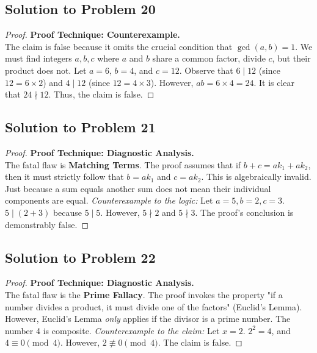 \documentclass[12pt]{article}
\begin{document}
\subsection{Solution to Problem 20}
\begin{proof}
\textbf{Proof Technique: Counterexample.} \\
The claim is false because it omits the crucial condition that $\gcd(a, b) = 1$. We must find integers $a, b, c$ where $a$ and $b$ share a common factor, divide $c$, but their product does not.
Let $a = 6$, $b = 4$, and $c = 12$.
Observe that $6 \mid 12$ (since $12 = 6 \times 2$) and $4 \mid 12$ (since $12 = 4 \times 3$).
However, $ab = 6 \times 4 = 24$.
It is clear that $24 \nmid 12$. Thus, the claim is false.
\end{proof}

\subsection{Solution to Problem 21}
\begin{proof}
\textbf{Proof Technique: Diagnostic Analysis.} \\
The fatal flaw is \textbf{Matching Terms}. The proof assumes that if $b+c = ak_1 + ak_2$, then it must strictly follow that $b = ak_1$ and $c = ak_2$. This is algebraically invalid. Just because a sum equals another sum does not mean their individual components are equal. 
\textit{Counterexample to the logic:} Let $a = 5, b = 2, c = 3$. $5 \mid (2+3)$ because $5 \mid 5$. However, $5 \nmid 2$ and $5 \nmid 3$. The proof's conclusion is demonstrably false.
\end{proof}

\subsection{Solution to Problem 22}
\begin{proof}
\textbf{Proof Technique: Diagnostic Analysis.} \\
The fatal flaw is the \textbf{Prime Fallacy}. The proof invokes the property "if a number divides a product, it must divide one of the factors" (Euclid's Lemma). However, Euclid's Lemma \textit{only} applies if the divisor is a prime number. The number 4 is composite.
\textit{Counterexample to the claim:} Let $x = 2$. $2^2 = 4$, and $4 \equiv 0 \pmod 4$. However, $2 \not\equiv 0 \pmod 4$. The claim is false.
\end{proof}
\end{document}
